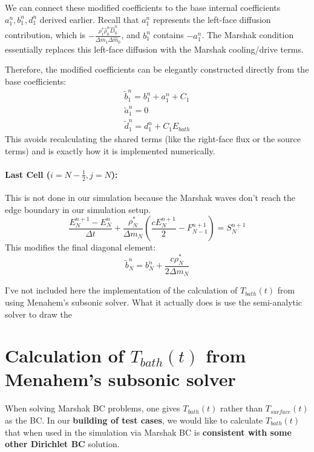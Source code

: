 \documentclass[11pt]{article}
\begin{document}
\begin{notebox}
We can connect these modified coefficients to the base internal coefficients $a_1^n, b_1^n, d_1^n$ derived earlier. Recall that $a_1^n$ represents the left-face diffusion contribution, which is $-\frac{\rho_1^* \hat{\rho}_0^n \hat{D}_0^n}{\Delta m_1 \Delta \hat{m}_0}$, and $b_1^n$ contains $-a_1^n$. The Marshak condition essentially replaces this left-face diffusion with the Marshak cooling/drive terms. 

Therefore, the modified coefficients can be elegantly constructed directly from the base coefficients:
\begin{gather}
    \boxed{ \tilde{b}_1^n = b_1^n + a_1^n + C_1 } \\
    \boxed{ \tilde{a}_1^n = 0 } \\
    \boxed{ \tilde{d}_1^n = d_1^n + C_1 E_{bath} }
\end{gather}
This avoids recalculating the shared terms (like the right-face flux or the source terms) and is exactly how it is implemented numerically.
\end{notebox}
  \paragraph{Last Cell ($i=N-\frac{1}{2}, j=N$):}
  This is not done in our simulation because the Marshak waves don't reach the edge boundary in our simulation setup.
  \begin{equation}
      \frac{E_N^{n+1} - E_N^n}{\Delta t} + \frac{\rho_N^*}{\Delta m_N} \left( \frac{c E_N^{n+1}}{2} - F_{N-1}^{n+1} \right) = S_N^{n+1}
  \end{equation}
  This modifies the final diagonal element:
  \begin{equation}
      \boxed{\tilde{b}_N^n = b_N^n + \frac{c \rho_N^*}{2 \Delta m_N}}
  \end{equation}
  \begin{notebox}
    I've not included here the implementation of the calculation of $T_{bath}(t)$ from  using Menahem's subsonic solver. What it actually does is use the semi-analytic solver to draw the 
  \end{notebox}
\newpage
\newpage
\section{Calculation of $T_{bath}(t)$ from Menahem's subsonic solver}
  When solving Marshak BC problems, one gives $T_{bath}(t)$ rather than $T_{surface}(t)$ as the BC. In our \textbf{building of test cases}, we would like to calculate $T_{bath}(t)$ that when used in the simulation via Marshak BC is \textbf{consistent with some other Dirichlet BC} solution.
\end{document}
